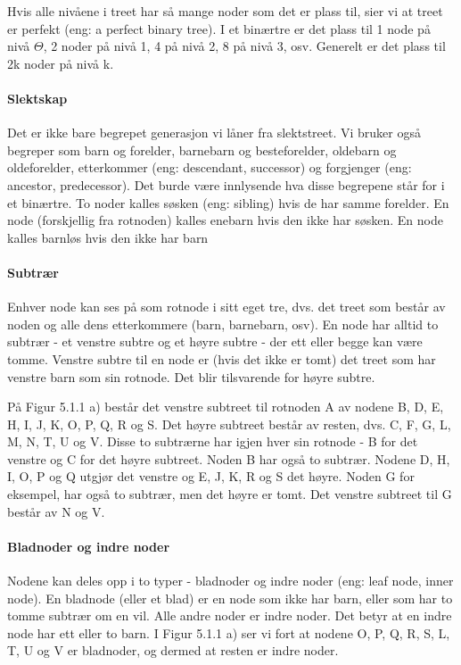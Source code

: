 \documentclass[11pt]{article}
\begin{document}
            Hvis alle nivåene i treet har så mange noder som det er plass til, sier vi at treet er perfekt
            (eng: a perfect binary tree). I et binærtre er det plass til 1 node på nivå $\Theta$, 2 noder på nivå 1,
            4 på nivå 2, 8 på nivå 3, osv. Generelt er det plass til 2k
            noder på nivå k.

            \paragraph{Slektskap}
            Det er ikke bare begrepet generasjon vi låner fra slektstreet. Vi bruker også
            begreper som barn og forelder, barnebarn og besteforelder, oldebarn og oldeforelder,
            etterkommer (eng: descendant, successor) og forgjenger (eng: ancestor, predecessor). Det
            burde være innlysende hva disse begrepene står for i et binærtre. To noder kalles søsken
            (eng: sibling) hvis de har samme forelder. En node (forskjellig fra rotnoden) kalles enebarn
            hvis den ikke har søsken. En node kalles barnløs hvis den ikke har barn

            \paragraph{Subtrær}
            Enhver node kan ses på som rotnode i sitt eget tre, dvs. det treet som består av
            noden og alle dens etterkommere (barn, barnebarn, osv). En node har alltid to subtrær - et
            venstre subtre og et høyre subtre - der ett eller begge kan være tomme. Venstre subtre til
            en node er (hvis det ikke er tomt) det treet som har venstre barn som sin rotnode. Det blir
            tilsvarende for høyre subtre.

            På Figur 5.1.1 a) består det venstre subtreet til rotnoden A av nodene B, D, E, H, I, J, K, O, P,
            Q, R og S. Det høyre subtreet består av resten, dvs. C, F, G, L, M, N, T, U og V. Disse to
            subtrærne har igjen hver sin rotnode - B for det venstre og C
            for det høyre subtreet. Noden B har også to subtrær. Nodene
            D, H, I, O, P og Q utgjør det venstre og E, J, K, R og S det
            høyre. Noden G for eksempel, har også to subtrær, men det
            høyre er tomt. Det venstre subtreet til G består av N og V.

            \paragraph{Bladnoder og indre noder}
            Nodene kan deles opp i to typer
            - bladnoder og indre noder (eng: leaf node, inner node). En
            bladnode (eller et blad) er en node som ikke har barn, eller
            som har to tomme subtrær om en vil. Alle andre noder er
            indre noder. Det betyr at en indre node har ett eller to barn.
            I Figur 5.1.1 a) ser vi fort at nodene O, P, Q, R, S, L, T, U og
            V er bladnoder, og dermed at resten er indre noder.
\end{document}
